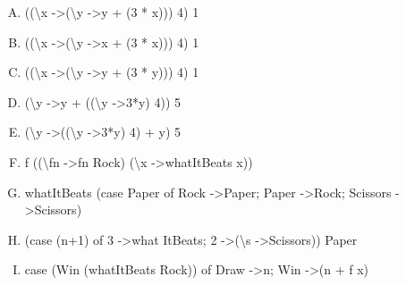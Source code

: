 \begin{enumerate}[A.]
\item ((\textbackslash x -\textgreater  (\textbackslash y -\textgreater  y + (3 * x))) 4) 1
\item ((\textbackslash x -\textgreater  (\textbackslash y -\textgreater  x + (3 * x))) 4) 1
\item ((\textbackslash x -\textgreater  (\textbackslash y -\textgreater  y + (3 * y))) 4) 1
\item (\textbackslash y -\textgreater  y + ((\textbackslash y -\textgreater  3*y) 4)) 5
\item (\textbackslash y -\textgreater  ((\textbackslash y -\textgreater  3*y) 4) + y) 5
\item f ((\textbackslash fn -\textgreater  fn Rock) (\textbackslash x -\textgreater  whatItBeats x))
\item whatItBeats (case Paper of {Rock -\textgreater  Paper; Paper -\textgreater  Rock; Scissors -\textgreater  Scissors})
\item (case (n+1) of {3 -\textgreater  what ItBeats; 2 -\textgreater  (\textbackslash s -\textgreater  Scissors)}) Paper
\item case (Win (whatItBeats Rock)) of {Draw -\textgreater  n; Win -\textgreater  (n + f x)}
\end{enumerate}
